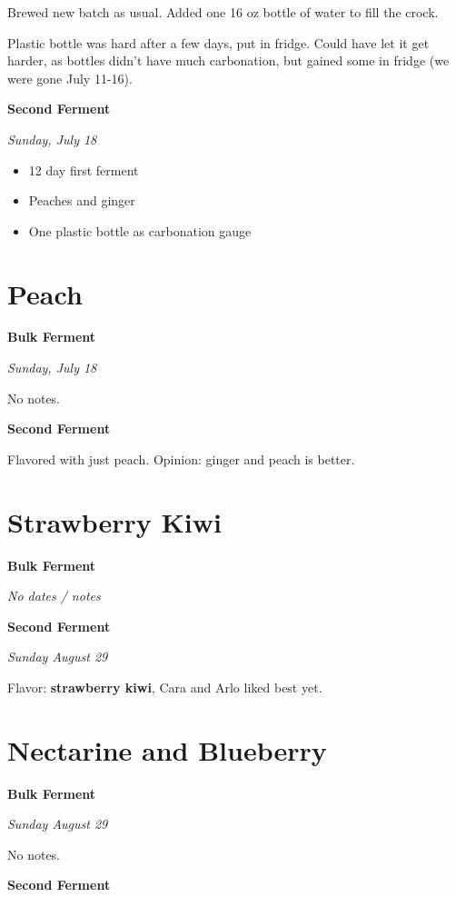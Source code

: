 \documentclass[
]{book}
\providecommand{\tightlist}{%
  \setlength{\itemsep}{0pt}\setlength{\parskip}{0pt}}
\begin{document}
Brewed new batch as usual. Added one 16 oz bottle of water to fill the crock.

Plastic bottle was hard after a few days, put in fridge. Could have let it get harder, as bottles didn't have much carbonation, but gained some in fridge (we were gone July 11-16).

\textbf{Second Ferment}

\emph{Sunday, July 18}

\begin{itemize}
\tightlist
\item
  12 day first ferment
\item
  Peaches and ginger
\item
  One plastic bottle as carbonation gauge
\end{itemize}

\hypertarget{peach}{%
\section{Peach}\label{peach}}

\textbf{Bulk Ferment}

\emph{Sunday, July 18}

No notes.

\textbf{Second Ferment}

Flavored with just peach. Opinion: ginger and peach is better.

\hypertarget{strawberry-kiwi}{%
\section{Strawberry Kiwi}\label{strawberry-kiwi}}

\textbf{Bulk Ferment}

\emph{No dates / notes}

\textbf{Second Ferment}

\emph{Sunday August 29}

Flavor: \textbf{strawberry kiwi}, Cara and Arlo liked best yet.

\hypertarget{nectarine-and-blueberry}{%
\section{Nectarine and Blueberry}\label{nectarine-and-blueberry}}

\textbf{Bulk Ferment}

\emph{Sunday August 29}

No notes.

\textbf{Second Ferment}
\end{document}
